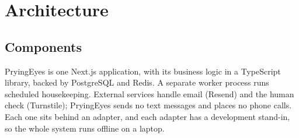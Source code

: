 \chapter{Architecture}
\label{ch:architecture}

\section{Components}

PryingEyes is one Next.js application, with its business logic in a TypeScript library, backed by PostgreSQL and Redis. A separate worker process runs scheduled housekeeping. External services handle email (Resend) and the human check (Turnstile); PryingEyes sends no text messages and places no phone calls. Each one sits behind an adapter, and each adapter has a development stand-in, so the whole system runs offline on a laptop.

